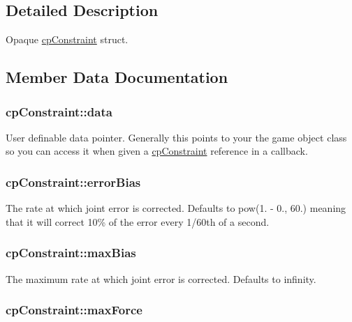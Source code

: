 \subsection{Detailed Description}
Opaque \hyperlink{structcp_constraint}{cp\-Constraint} struct. 

\subsection{Member Data Documentation}
\hypertarget{structcp_constraint_ae2adf6ccf6a057e05fa6eaf1d6843052}{
\subsubsection[{data}]{ {\bf cp\-Constraint\-::data}}}\label{structcp_constraint_ae2adf6ccf6a057e05fa6eaf1d6843052}
User definable data pointer. Generally this points to your the game object class so you can access it when given a \hyperlink{structcp_constraint}{cp\-Constraint} reference in a callback. \hypertarget{structcp_constraint_a4cfd0b995f500090fc5811635ed57614}{
\subsubsection[{error\-Bias}]{ {\bf cp\-Constraint\-::error\-Bias}}}\label{structcp_constraint_a4cfd0b995f500090fc5811635ed57614}
The rate at which joint error is corrected. Defaults to pow(1. -\/ 0., 60.) meaning that it will correct 10\% of the error every 1/60th of a second. \hypertarget{structcp_constraint_aac8ae38ee220e975dc4abbee86996e62}{
\subsubsection[{max\-Bias}]{ {\bf cp\-Constraint\-::max\-Bias}}}\label{structcp_constraint_aac8ae38ee220e975dc4abbee86996e62}
The maximum rate at which joint error is corrected. Defaults to infinity. \hypertarget{structcp_constraint_a993d4e5c9439d7b913bd391e955e0e5b}{
\subsubsection[{max\-Force}]{ {\bf cp\-Constraint\-::max\-Force}}}\label{structcp_constraint_a993d4e5c9439d7b913bd391e955e0e5b}
